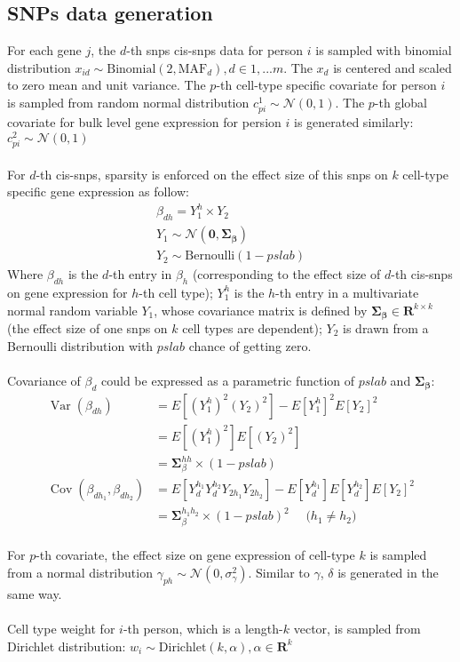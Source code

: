 \documentclass{article}
\newcommand{\matr}[1]{\mathbf{#1}}
\DeclareMathOperator{\Var}{Var}
\DeclareMathOperator{\Cov}{Cov}
\begin{document}
\subsection{SNPs data generation}
For each gene $j$, the $d$-th snps cis-snps data for person $i$ is sampled with binomial distribution $x_{id}\sim \text{Binomial}(2,\text{MAF}_{d}), d\in 1,...m$. The $x_d$ is centered and scaled to zero mean and unit variance. The $p$-th cell-type specific covariate for person $i$ is sampled from random normal distribution $c^1_{pi} \sim \mathcal{N}{(0,1)}$. The $p$-th global covariate for bulk level gene expression for persion $i$ is generated similarly: $c^2_{pi}  \sim \mathcal{N}{(0,1)}$\\\\
For $d$-th cis-snps, sparsity is enforced on the effect size of this snps on $k$ cell-type specific gene expression as follow:
\begin{gather}
    \beta_{dh} = Y^h_1\times Y_2\\
    Y_1 \sim \mathcal{N}{(\matr{0},\matr{\Sigma_{\beta}})} \nonumber\\
    Y_2 \sim \text{Bernoulli}(1-pslab) \nonumber
\end{gather}
Where $\beta_{dh}$ is the $d$-th entry in $\beta_h$ (corresponding to the effect size of $d$-th cis-snps on gene expression for $h$-th cell type); $Y^h_1$ is the $h$-th entry in a multivariate normal random variable $Y_1$, whose covariance matrix is defined by $\matr{\Sigma_{\beta}}\in \mathbf{R}^{k\times k}$ (the effect size of one snps on $k$ cell types are dependent); $Y_2$ is drawn from a Bernoulli distribution with $pslab$ chance of getting zero.\\\\
Covariance of $\beta_d$ could be expressed as a parametric function of $pslab$ and $\matr{\Sigma_\beta}$:
\begin{align}
    \Var{(\beta_{dh})} &= E[(Y^h_1)^2(Y_2)^2]-E[Y^h_1]^2E[Y_2]^2\nonumber\\
    &= E[(Y^h_1)^2]E[(Y_2)^2]\nonumber\\
    &= \matr{\Sigma}^{hh}_{\beta}\times(1-pslab)\\
    \Cov{(\beta_{dh_1},\beta_{dh_2})} &= E[Y^{h_1}_dY^{h_2}_dY_{2h_1}Y_{2h_2}]-E[Y_d^{h_1}]E[Y_d^{h_2}]E[Y_2]^2\nonumber\\
    &= \matr{\Sigma}^{h_1h_2}_{\beta} \times (1-pslab)^2\quad\text{ ($h_1\neq h_2$)}
\end{align}
\\For $p$-th covariate, the effect size on gene expression of cell-type $k$ is sampled from a normal distribution $\gamma_{ph}\sim \mathcal{N}{(0,\sigma^2_{\gamma})}$. Similar to $\gamma$, $\delta$ is generated in the same way.\\\\
Cell type weight for $i$-th person, which is a length-$k$ vector, is sampled from Dirichlet distribution: $w_i \sim \text{Dirichlet}{(k,\alpha)}, \alpha\in \mathbf{R}^k$
\end{document}
